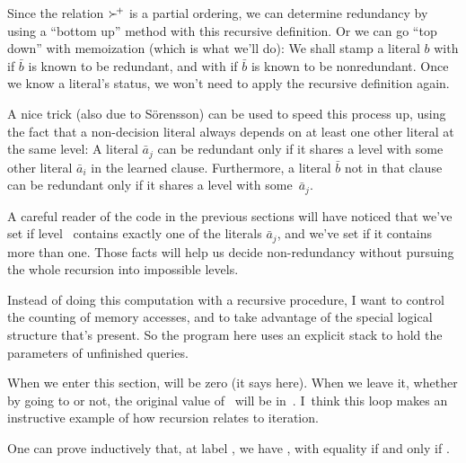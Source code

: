Since the relation $\mathrel{{\succ}\!^+}$ is a partial ordering, we can determine
redundancy by using a ``bottom up'' method with this recursive definition.
Or we can go ``top down'' with memoization (which is what we'll do):
We shall stamp a literal $b$ with  if $\bar b$ is
known to
be redundant, and with  if $\bar b$ is known to be
nonredundant.
Once we know a literal's status, we won't need to apply the recursive
definition again.

A nice trick (also due to S\"orensson) can be used to speed this process up,
using the fact that a non-decision literal always depends on at least one
other literal at the same level: A literal $\bar a_j$ can be redundant
only if it shares a level with some other literal $\bar a_i$ in the
learned clause. Furthermore, a literal $\bar b$ not in that clause can be
redundant only if it shares a level with some~$\bar a_j$.

A careful reader of the code in the previous sections will have noticed
that we've set  if level~
contains exactly one
of the literals $\bar a_j$, and we've set 
if it contains more than one. Those facts will help us decide non-redundancy
without pursuing the whole recursion into impossible levels.

\fi

Instead of doing this computation with a recursive
procedure, I want
to control the counting of memory accesses, and to take advantage of
the special logical structure that's present. So the program here uses an
explicit stack to hold the parameters of unfinished queries.

When we enter this section,  will be zero (it says here).
When we leave it, whether by going to  or not,
the original value of~ will be in~.
I~think this loop makes an instructive
example of how recursion relates to iteration.

One can prove inductively that, at label , we have
, with equality if and
only if .

